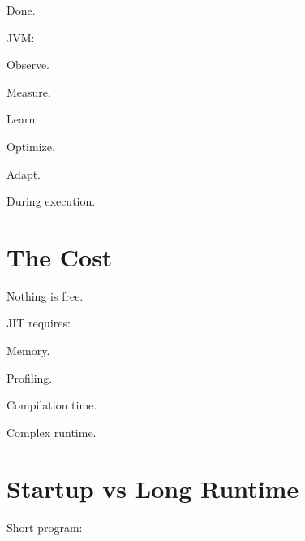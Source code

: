 \documentclass[11pt,a4paper]{book}
\begin{document}

Done.


JVM:


Observe.

Measure.

Learn.

Optimize.

Adapt.


During execution.


\section{The Cost}

Nothing is free.


JIT requires:


Memory.


Profiling.


Compilation time.


Complex runtime.


\section{Startup vs Long Runtime}

Short program:

\end{document}
